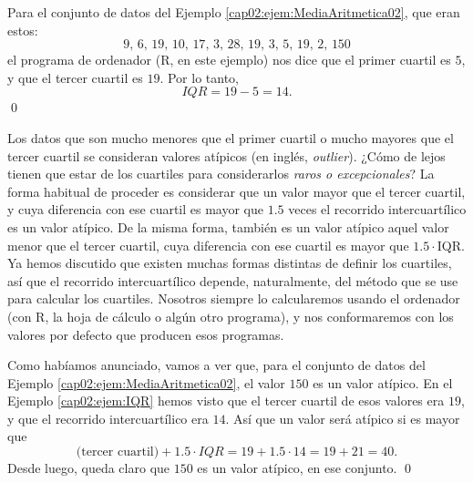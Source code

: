         \begin{center}
        \end{center}
\begin{ejemplo}
\label{cap02:ejem:IQR}
Para el conjunto de datos del Ejemplo \ref{cap02:ejem:MediaAritmetica02}, que eran estos:
\[9,\, 6,\, 19,\, 10,\, 17,\, 3,\, 28,\, 19,\, 3,\, 5,\, 19,\, 2,\, 150\]
el programa de ordenador (R, en este ejemplo) nos dice que el primer cuartil es $5$, y que el tercer cuartil es $19$. Por lo tanto,
\[IQR=19 - 5 = 14.\]
\qed
\end{ejemplo}

Los datos que son mucho menores que el primer cuartil o mucho mayores que el tercer cuartil se
consideran {\sf valores atípicos} (en
inglés, {\em outlier}). ¿Cómo de lejos tienen que estar de los cuartiles para
considerarlos {\em raros o excepcionales}? La forma habitual de proceder es considerar que {\sf un
valor mayor que el tercer cuartil, y cuya diferencia con ese cuartil es mayor que $1.5$ veces el
recorrido intercuartílico es un valor atípico}. De la misma forma, también es un valor atípico
aquel valor menor que el tercer cuartil, cuya diferencia con ese cuartil es mayor que
$1.5\cdot$IQR. Ya hemos discutido que existen muchas formas distintas de definir los cuartiles, así
que el recorrido intercuartílico depende, naturalmente, del método que se use para calcular los
cuartiles. Nosotros siempre lo calcularemos usando el ordenador (con R, la hoja de cálculo o algún
otro programa), y nos conformaremos con los valores por defecto que producen esos programas.

\begin{ejemplo}
\label{cap02:ejem:ValorAtipico}
Como habíamos anunciado, vamos a ver que, para el conjunto de datos del Ejemplo \ref{cap02:ejem:MediaAritmetica02}, el valor $150$ es un valor atípico. En el Ejemplo \ref{cap02:ejem:IQR} hemos visto que el tercer cuartil de esos valores era $19$, y que el recorrido intercuartílico era $14$. Así que un valor será atípico si es mayor que
\[\mbox{(tercer cuartil)}+1.5\cdot IQR=19 + 1.5 \cdot 14=19 + 21= 40.\]
Desde luego, queda claro que $150$ es un valor atípico, en ese conjunto.
\qed
\end{ejemplo}

